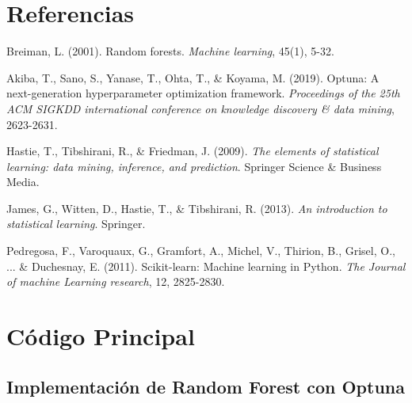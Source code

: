 \documentclass[12pt,a4paper]{article}
\begin{document}
\section{Referencias}

\begin{thebibliography}{9}

Breiman, L. (2001). Random forests. \textit{Machine learning}, 45(1), 5-32.

Akiba, T., Sano, S., Yanase, T., Ohta, T., \& Koyama, M. (2019). Optuna: A next-generation hyperparameter optimization framework. \textit{Proceedings of the 25th ACM SIGKDD international conference on knowledge discovery \& data mining}, 2623-2631.

Hastie, T., Tibshirani, R., \& Friedman, J. (2009). \textit{The elements of statistical learning: data mining, inference, and prediction}. Springer Science \& Business Media.

James, G., Witten, D., Hastie, T., \& Tibshirani, R. (2013). \textit{An introduction to statistical learning}. Springer.

Pedregosa, F., Varoquaux, G., Gramfort, A., Michel, V., Thirion, B., Grisel, O., ... \& Duchesnay, E. (2011). Scikit-learn: Machine learning in Python. \textit{The Journal of machine Learning research}, 12, 2825-2830.

\end{thebibliography}

\appendix

\section{Código Principal}

\subsection{Implementación de Random Forest con Optuna}
\end{document}
